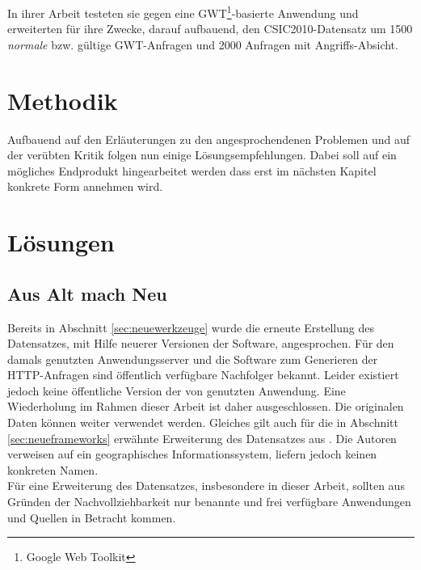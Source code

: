 In ihrer Arbeit testeten sie gegen eine GWT\footnote{Google Web Toolkit}-basierte Anwendung und erweiterten für ihre Zwecke, darauf aufbauend, den CSIC2010-Datensatz um 1500 \emph{normale} bzw. gültige GWT-Anfragen und 2000 Anfragen mit Angriffs-Absicht.



\section{Methodik}
Aufbauend auf den Erläuterungen zu den angesprochendenen Problemen und auf der verübten Kritik folgen nun einige Lösungsempfehlungen. Dabei soll auf ein mögliches Endprodukt hingearbeitet werden dass erst im nächsten Kapitel konkrete Form annehmen wird. 

\section{Lösungen}

\subsection{Aus Alt mach Neu}
\label{sec:lsgalt}
Bereits in Abschnitt \ref{sec:neuewerkzeuge} wurde die erneute Erstellung des Datensatzes, mit Hilfe neuerer Versionen der Software, angesprochen. Für den damals genutzten Anwendungsserver und die Software zum Generieren der HTTP-Anfragen sind öffentlich verfügbare Nachfolger bekannt. Leider existiert jedoch keine öffentliche Version der von \cite{Giménez2015} genutzten Anwendung. Eine Wiederholung im Rahmen dieser Arbeit ist daher ausgeschlossen. Die originalen Daten können weiter verwendet werden. Gleiches gilt auch für die in Abschnitt \ref{sec:neueframeworks} erwähnte Erweiterung des Datensatzes aus \cite{kozik2019}. Die Autoren verweisen auf ein geographisches Informationssystem, liefern jedoch keinen konkreten Namen.\\

Für eine Erweiterung des Datensatzes, insbesondere in dieser Arbeit, sollten aus Gründen der Nachvollziehbarkeit nur benannte und frei verfügbare Anwendungen und Quellen in Betracht kommen. 




